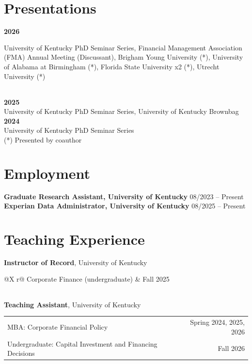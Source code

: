 \documentclass[11pt]{article}
\newcommand{\entry}[2]{\textbf{#1} \hfill #2\\}
\begin{document}
\section*{Presentations}
\entry{2026}{}
\hspace{1.2em}\parbox[t]{\dimexpr\textwidth-1.2em}{University of Kentucky PhD Seminar Series, Financial Management Association (FMA) Annual Meeting (Discussant), Brigham Young University (*), University of Alabama at Birmingham (*), Florida State University x2 (*), Utrecht University (*)}\\
\entry{2025}{}
\hspace{1.2em}University of Kentucky PhD Seminar Series, University of Kentucky Brownbag\\
\entry{2024}{}
\hspace{1.2em}University of Kentucky PhD Seminar Series\\[2pt]
{\small (*) Presented by coauthor}

\section*{Employment}
\entry{Graduate Research Assistant, University of Kentucky}{08/2023 -- Present}
\entry{Experian Data Administrator, University of Kentucky}{08/2025 -- Present}

\section*{Teaching Experience}
\textbf{Instructor of Record}, University of Kentucky\\
\begin{tabularx}{\textwidth}{@{\hspace{1.2em}}X r@{}}
Corporate Finance (undergraduate) & Fall 2025 \\
 \\
\end{tabularx}

\smallskip
\textbf{Teaching Assistant}, University of Kentucky\\
\begin{tabularx}{\textwidth}{@{\hspace{1.2em}}X r@{}}
MBA: Corporate Financial Policy & Spring 2024, 2025, 2026 \\
Undergraduate: Capital Investment and Financing Decisions & Fall 2026 \\
\end{tabularx}
\end{document}
